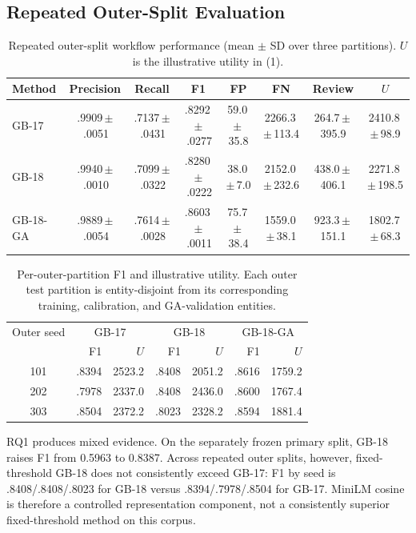 \documentclass[conference]{IEEEtran}
\newcommand{\pmv}{\,$\pm$\,}
\begin{document}
\subsection{Repeated Outer-Split Evaluation}
\begin{table}[!t]
\caption{Repeated outer-split workflow performance (mean $\pm$ SD over three partitions). $U$ is the illustrative utility in (1).}
\label{tab:performance}
\centering\small
\begin{tabular}{lccccccc}
\toprule
Method & Precision & Recall & F1 & FP & FN & Review & $U$\\
\midrule
GB-17 & .9909\pmv.0051 & .7137\pmv.0431 & .8292\pmv.0277 & 59.0\pmv35.8 & 2266.3\pmv113.4 & 264.7\pmv395.9 & 2410.8\pmv98.9\\
GB-18 & .9940\pmv.0010 & .7099\pmv.0322 & .8280\pmv.0222 & 38.0\pmv7.0 & 2152.0\pmv232.6 & 438.0\pmv406.1 & 2271.8\pmv198.5\\
GB-18-GA & .9889\pmv.0054 & .7614\pmv.0028 & .8603\pmv.0011 & 75.7\pmv38.4 & 1559.0\pmv38.1 & 923.3\pmv151.1 & 1802.7\pmv68.3\\
\bottomrule
\end{tabular}
\end{table}

\begin{table}[!t]
\caption{Per-outer-partition F1 and illustrative utility. Each outer test partition is entity-disjoint from its corresponding training, calibration, and GA-validation entities.}
\label{tab:perouter}
\centering\small
\begin{tabular}{crrrrrr}
\toprule
Outer seed & \multicolumn{2}{c}{GB-17} & \multicolumn{2}{c}{GB-18} & \multicolumn{2}{c}{GB-18-GA}\\
& F1 & $U$ & F1 & $U$ & F1 & $U$\\
\midrule
101 & .8394 & 2523.2 & .8408 & 2051.2 & .8616 & 1759.2\\
202 & .7978 & 2337.0 & .8408 & 2436.0 & .8600 & 1767.4\\
303 & .8504 & 2372.2 & .8023 & 2328.2 & .8594 & 1881.4\\
\bottomrule
\end{tabular}
\end{table}

RQ1 produces mixed evidence. On the separately frozen primary split, GB-18 raises F1 from 0.5963 to 0.8387. Across repeated outer splits, however, fixed-threshold GB-18 does not consistently exceed GB-17: F1 by seed is .8408/.8408/.8023 for GB-18 versus .8394/.7978/.8504 for GB-17. MiniLM cosine is therefore a controlled representation component, not a consistently superior fixed-threshold method on this corpus.
\end{document}
